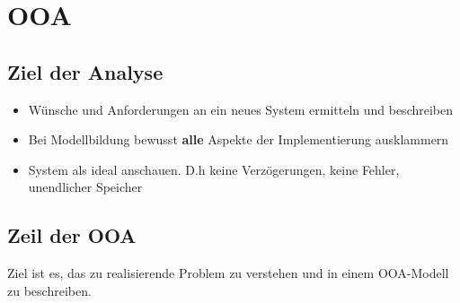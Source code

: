 
\section{OOA}

\subsection{Ziel der Analyse}
  \begin{itemize}[leftmargin = 0.5cm]
    \item Wünsche und Anforderungen an  ein neues System ermitteln und beschreiben
    \item Bei Modellbildung bewusst \textbf{alle} Aspekte der Implementierung ausklammern
    \item System als ideal anschauen. D.h keine Verzögerungen, keine Fehler, unendlicher Speicher
  \end{itemize}
  
\subsection{Zeil der OOA}
  Ziel ist es, das zu realisierende Problem zu verstehen und in einem OOA-Modell zu beschreiben.
  
